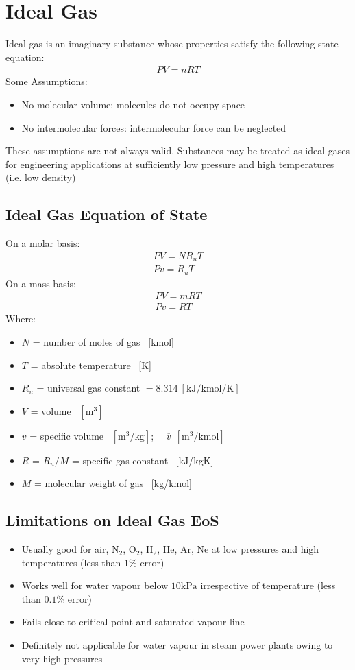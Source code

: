 \section{Ideal Gas}
Ideal gas is an imaginary substance whose properties satisfy the following state equation:
\begin{gather}
  PV = nRT
\end{gather}
Some Assumptions:
\begin{itemize}[noitemsep]
  \item No molecular volume: molecules do not occupy space
  \item No intermolecular forces: intermolecular force can be neglected
\end{itemize}
These assumptions are not always valid. Substances may be treated as ideal gases for engineering applications at sufficiently low pressure and high temperatures (i.e. low density)
\subsection{Ideal Gas Equation of State}
On a molar basis:
\begin{gather}
  PV = NR_uT \\[5pt]
  P\overline{v} = R_uT
\end{gather}
On a mass basis:
\begin{gather}
  PV = mRT \\[5pt]
  Pv = RT
\end{gather}
Where:
\begin{itemize}[noitemsep]
  \item $N$ = number of moles of gas \ [kmol]
  \item $T$ = absolute temperature \ [K]
  \item $R_u$ = universal gas constant $= 8.314 \ [\si{\kilo\joule\per\kilo\mole\per\kelvin}]$
  \item $V$ = volume \ $[\si{\metre\cubed}]$
  \item $v$ = specific volume \ $[\si{\metre\cubed\per\kilogram}]$; \ \ $\overline{v} \ \ [\si{\metre\cubed\per\kilo\mole}]$
  \item $R$ = $R_u/M$ = specific gas constant \ [kJ/kgK]
  \item $M$ = molecular weight of gas \ [kg/kmol]
\end{itemize}
\subsection{Limitations on Ideal Gas EoS}
\begin{itemize}
  \item Usually good for air, N$_2$, O$_2$, H$_2$, He, Ar, Ne at low pressures and high temperatures (less than $1\%$ error)
  \item Works well for water vapour below $10\si{\kilo\pascal}$ irrespective of temperature (less than $0.1\%$ error)
  \item Fails close to critical point and saturated vapour line
  \item Definitely not applicable for water vapour in steam power plants owing to very high pressures
\end{itemize}
